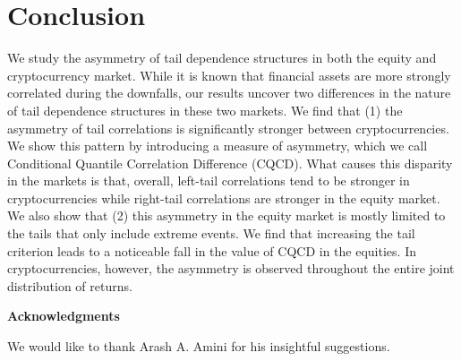\documentclass{article}
\begin{document}
\section{Conclusion}\label{con}
We study the asymmetry of tail dependence structures in both the equity and cryptocurrency market. While it is known that financial assets are more strongly correlated during the downfalls, our results uncover two differences in the nature of tail dependence structures in these two markets. We find that (1) the asymmetry of tail correlations is significantly stronger between cryptocurrencies. We show this pattern by introducing a measure of asymmetry, which we call Conditional Quantile Correlation Difference (CQCD). What causes this disparity in the markets is that, overall, left-tail correlations tend to be stronger in cryptocurrencies while right-tail correlations are stronger in the equity market. We also show that (2) this asymmetry in the equity market is mostly limited to the tails that only include extreme events. We find that increasing the tail criterion leads to a noticeable fall in the value of CQCD in the equities. In cryptocurrencies, however, the asymmetry is observed throughout the entire joint distribution of returns. \par

\vspace{2mm}
\noindent\textbf{Acknowledgments} \par
We would like to thank Arash A. Amini for his insightful suggestions. 


\end{document}
